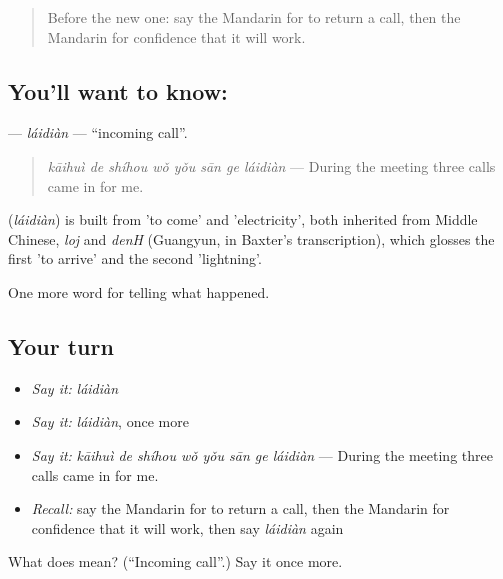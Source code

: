 \label{lesson:ZH-C319-laidian}



\begin{quote}
Before the new one: say the Mandarin for to return a call, then the Mandarin for confidence that it will work.
\end{quote}

\subsection*{You'll want to know: }
\textbf{} — \emph{láidiàn} — \textquotedblleft{}incoming call\textquotedblright{}.

\begin{quote}
\textbf{} \emph{kāihuì de shíhou wǒ yǒu sān ge láidiàn} — During the meeting three calls came in for me.
\end{quote}

\begin{cousinweb}
\textbf{} (\emph{láidiàn}) is built from  'to come' and  'electricity', both inherited from Middle Chinese, \emph{loj} and \emph{denH} (Guangyun, in Baxter's transcription), which glosses the first 'to arrive' and the second 'lightning'.
\end{cousinweb}

\begin{grammarlens}[title={What you've built}]
One more word for telling what happened.
\end{grammarlens}

\subsection*{Your turn}
\begin{itemize}
\raggedright
  \item \emph{Say it:} \emph{láidiàn}
  \item \emph{Say it:} \emph{láidiàn}, once more
  \item \emph{Say it:} \emph{kāihuì de shíhou wǒ yǒu sān ge láidiàn} — During the meeting three calls came in for me.
  \item \emph{Recall:} say the Mandarin for to return a call, then the Mandarin for confidence that it will work, then say \emph{láidiàn} again
\end{itemize}

\begin{tcolorbox}[breakable,colback=teal!4,colframe=teal!35!black,title={Before you move on}]
What does  mean? (\textquotedblleft{}Incoming call\textquotedblright{}.) Say it once more.
\end{tcolorbox}
